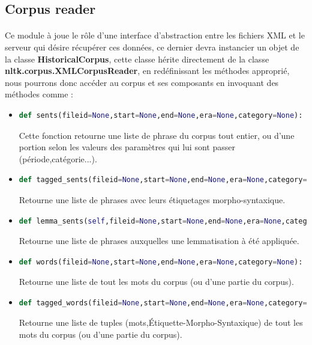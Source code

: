 \documentclass[]{report}
\begin{document}
		\subsection{Corpus reader}
			\paragraph{}
			Ce module à joue le rôle d'une interface d'abstraction entre les fichiers XML et le serveur qui désire récupérer ces données,
			ce dernier devra instancier un objet de la classe \textbf{HistoricalCorpus}, cette classe hérite directement de la classe \textbf{nltk.corpus.XMLCorpusReader}, en redéfinissant les méthodes approprié, nous pourrons donc accéder au corpus et ses composants en 
			invoquant des méthodes comme : 
			\begin{itemize}
				
				\item 
				\begin{lstlisting}[language=python]
					def sents(fileid=None,start=None,end=None,era=None,category=None):\end{lstlisting} 
				Cette fonction retourne une liste de phrase du corpus tout entier, ou d'une portion selon les valeurs des paramètres qui lui sont passer (période,catégorie...).
				
				\item 
				\begin{lstlisting}[language=python]
					def tagged_sents(fileid=None,start=None,end=None,era=None,category=None):\end{lstlisting}
				Retourne une liste de phrases avec leurs étiquetages morpho-syntaxique.
				
				\item 
				\begin{lstlisting}[language=python]
				def lemma_sents(self,fileid=None,start=None,end=None,era=None,category=None):\end{lstlisting}
				Retourne une liste de phrases auxquelles une lemmatisation à été appliquée.
				
				
				\item 
				\begin{lstlisting}[language=python]
					def words(fileid=None,start=None,end=None,era=None,category=None):\end{lstlisting}
				Retourne une liste de tout les mots du corpus (ou d'une partie du corpus).
				
				\item 
				\begin{lstlisting}[language=python]
				def tagged_words(fileid=None,start=None,end=None,era=None,category=None):\end{lstlisting}
				Retourne une liste de tuples (mots,Étiquette-Morpho-Syntaxique) de tout les mots du corpus (ou d'une partie du corpus).
				

\end{itemize}
\end{document}
